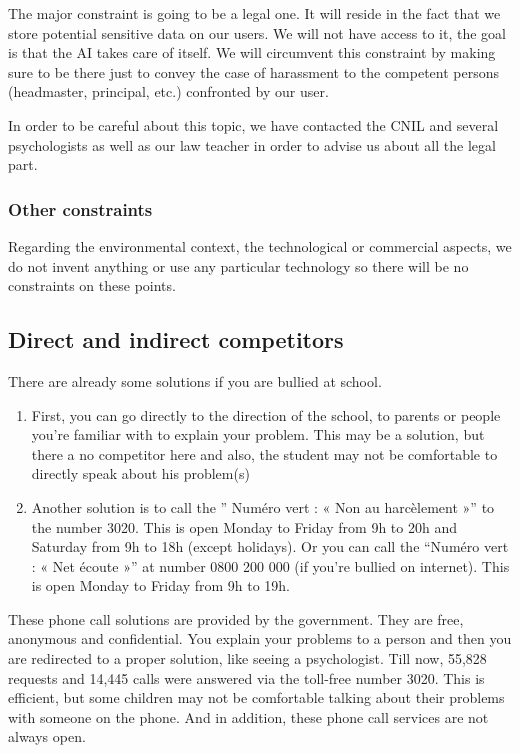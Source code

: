 \documentclass{article}
\begin{document}
The major constraint is going to be a legal one. It will reside in the fact that we store potential sensitive data on our users. We will not have access to it, the goal is that the AI takes care of itself. We will circumvent this constraint by making sure to be there just to convey the case of harassment to the competent persons (headmaster, principal, etc.) confronted by our user. 

\medskip

In order to be careful about this topic, we have contacted the CNIL and several psychologists as well as our law teacher in order to advise us about all the legal part. 

\subsubsection{Other constraints}

Regarding the environmental context, the technological or commercial aspects, we do not invent anything or use any particular technology so there will be no constraints on these points.

\subsection{Direct and indirect competitors}

There are already some solutions if you are bullied at school.

\begin{enumerate}
\item First, you can go directly to the direction of the school, to parents or people you're familiar with to
explain your problem. This may be a solution, but there a no competitor here and also, the student
may not be comfortable to directly speak about his problem(s)
\item Another solution is to call the '' Numéro vert : « Non au harcèlement »'' to the number 3020. This is
open Monday to Friday from 9h to 20h and Saturday from 9h to 18h (except holidays). Or you can
call the “Numéro vert : « Net écoute »” at number 0800 200 000 (if you’re bullied on internet). This is
open Monday to Friday from 9h to 19h. 
\end{enumerate}

These phone call solutions are provided by the government. They are free, anonymous and
confidential. You explain your problems to a person and then you are redirected to a proper solution,
like seeing a psychologist. Till now, 55,828 requests and 14,445 calls were answered via the toll-free
number 3020. This is efficient, but some children may not be comfortable talking about their
problems with someone on the phone. And in addition, these phone call services are not always
open.
\end{document}

